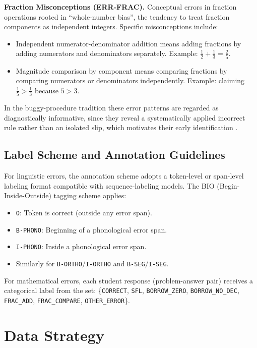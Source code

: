 \textbf{Fraction Misconceptions (ERR-FRAC).} Conceptual errors in fraction operations rooted in ``whole-number bias'', the tendency to treat fraction components as independent integers. Specific misconceptions include:
\begin{itemize}
    \item Independent numerator-denominator addition means adding fractions by adding numerators and denominators separately. Example: $\frac{1}{2} + \frac{1}{3} = \frac{2}{5}$.
    \item Magnitude comparison by component means comparing fractions by comparing numerators or denominators independently. Example: claiming $\frac{1}{5} > \frac{1}{3}$ because $5 > 3$.
\end{itemize}

In the buggy-procedure tradition these error patterns are regarded as diagnostically informative, since they reveal a systematically applied incorrect rule rather than an isolated slip, which motivates their early identification \parencite{VanLehn1990}.

\subsection{Label Scheme and Annotation Guidelines}
\label{sec:method_tax_labels}

For linguistic errors, the annotation scheme adopts a token-level or span-level labeling format compatible with sequence-labeling models. The BIO (Begin-Inside-Outside) tagging scheme applies:
\begin{itemize}
    \item \texttt{O}: Token is correct (outside any error span).
    \item \texttt{B-PHONO}: Beginning of a phonological error span.
    \item \texttt{I-PHONO}: Inside a phonological error span.
    \item Similarly for \texttt{B-ORTHO}/\texttt{I-ORTHO} and \texttt{B-SEG}/\texttt{I-SEG}.
\end{itemize}

For mathematical errors, each student response (problem-answer pair) receives a categorical label from the set: \{\texttt{CORRECT}, \texttt{SFL}, \texttt{BORROW\_ZERO}, \texttt{BORROW\_NO\_DEC}, \texttt{FRAC\_ADD}, \texttt{FRAC\_COMPARE}, \texttt{OTHER\_ERROR}\}.

\section{Data Strategy}
\label{sec:method_data}

